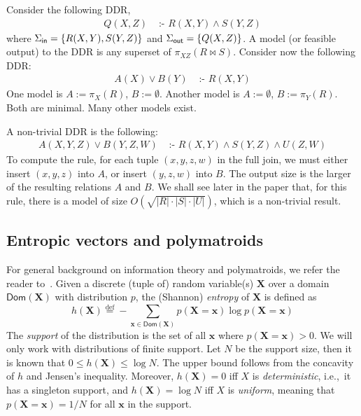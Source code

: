 \documentclass{theoretics}
\newcommand{\set}[1]{\{#1\}}                    %
\newcommand{\dom}{\textsf{Dom}}
\newcommand{\defeq}{\stackrel{\text{def}}{=}}
\newcommand{\cd}{\text{ :- }}
\newcommand{\inn}{\text{\sf in}}
\newcommand{\out}{\text{\sf out}}
\begin{document}
\begin{example}
  Consider the following DDR,
  \begin{align*}
    Q(X,Z) &\cd R(X,Y) \wedge S(Y,Z)
  \end{align*}
  where $\Sigma_\inn=\set{R(X,Y), S(Y,Z)}$ and
  $\Sigma_\out=\set{Q(X,Z)}$.  A model (or feasible output) to the DDR
is any superset of $\pi_{XZ}(R \Join S)$.
%
  Consider now the following DDR:
  \begin{align*}
    A(X) \vee B(Y) &\cd R(X,Y)
  \end{align*}
  One model is $A := \pi_X(R)$, $B := \emptyset$.  Another
  model is $A:= \emptyset$, $B := \pi_Y(R)$. Both are minimal.
  Many other models exist.

  A non-trivial DDR is the following:
  \begin{align}
    A(X,Y,Z) \vee B(Y,Z,W) &\cd R(X,Y) \wedge S(Y,Z) \wedge U(Z,W) \label{eq:ab:query}
  \end{align}
  To compute the rule, for each tuple $(x,y,z,w)$ in the full join, we
  must either insert $(x,y,z)$ into $A$, or insert $(y,z,w)$ into $B$.
  The output size is the larger of the resulting relations $A$ and $B$.
  We shall see later in the paper that, for this rule, there is a model of size
  $O(\sqrt{|R| \cdot |S| \cdot |U|})$, which is a non-trivial result.
\end{example}

\subsection{Entropic vectors and polymatroids}
\label{subsec:entropy}

For general background on information theory and polymatroids, we refer the reader
to~\cite{Yeung:2008:ITN:1457455}.
Given a discrete (tuple of) random variable(s) $\bm X$ over a domain $\dom(\bm X)$ with
distribution $p$, the (Shannon)
{\em entropy} of $\bm X$ is defined as
\[
  h(\bm X) \defeq -\sum_{\bm x\in \dom(\bm X)} p(\bm X=\bm x) \log p(\bm X=\bm x)
\]
The {\em support} of the distribution is the set of all $\bm x$ where $p(\bm X=\bm x) > 0$.
We will only work with distributions of finite support. Let $N$ be the support size, then it
is known that $0 \leq h(\bm X) \leq \log N$. The upper bound follows from the concavity of
$h$ and Jensen's inequality. Moreover, $h(\bm X) = 0$ iff $X$ is {\em deterministic}, i.e.,~it has a singleton support, and $h(\bm X) = \log N$ iff $X$ is {\em uniform}, meaning that
$p(\bm X=\bm x) = 1/N$ for all $\bm x$ in the support.
\end{document}
